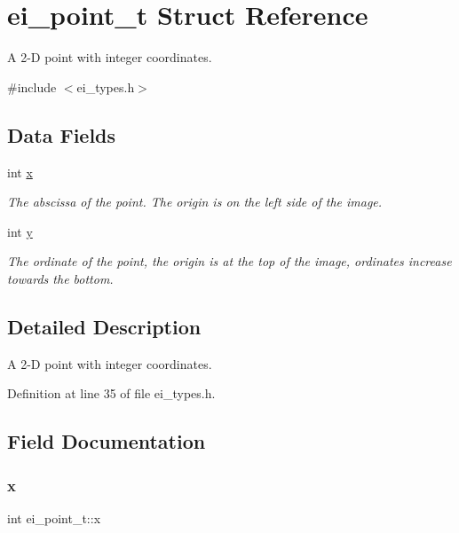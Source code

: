 \hypertarget{structei__point__t}{}\section{ei\+\_\+point\+\_\+t Struct Reference}
\label{structei__point__t}


A 2-\/D point with integer coordinates.  




{\ttfamily \#include $<$ei\+\_\+types.\+h$>$}

\subsection*{Data Fields}
\begin{DoxyCompactItemize}
\item 
int \hyperlink{structei__point__t_a6ec4a8846bae4b9694506dae039047b3}{x}
\begin{DoxyCompactList}\small\item\em The abscissa of the point. The origin is on the left side of the image. \end{DoxyCompactList}\item 
int \hyperlink{structei__point__t_a0c0f1bfa95c372595c52522877f556a0}{y}
\begin{DoxyCompactList}\small\item\em The ordinate of the point, the origin is at the top of the image, ordinates increase towards the bottom. \end{DoxyCompactList}\end{DoxyCompactItemize}


\subsection{Detailed Description}
A 2-\/D point with integer coordinates. 

Definition at line 35 of file ei\+\_\+types.\+h.



\subsection{Field Documentation}
\mbox{\label{structei__point__t_a6ec4a8846bae4b9694506dae039047b3}} 
\subsubsection{\texorpdfstring{x}{x}}
{\footnotesize\ttfamily int ei\+\_\+point\+\_\+t\+::x}



